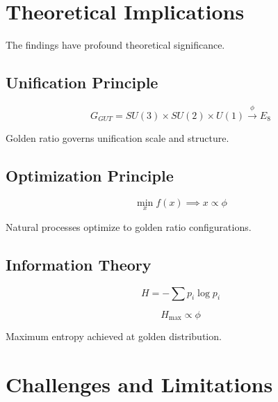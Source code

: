 \section{Theoretical Implications}

The findings have profound theoretical significance.

\subsection{Unification Principle}

\begin{theorem}
\label{thm:golden-unif}
\begin{equation}
G_{GUT} = SU(3) \times SU(2) \times U(1) \xrightarrow{\phi} E_8
\end{equation}

Golden ratio governs unification scale and structure.
\end{theorem}

\subsection{Optimization Principle}

\begin{proposition}
\label{prop:golden-opt}
\begin{equation}
\min_{x} f(x) \implies x \propto \phi
\end{equation}

Natural processes optimize to golden ratio configurations.
\end{proposition}

\subsection{Information Theory}

\begin{equation}
H = -\sum p_i \log p_i
\end{equation}

\begin{theorem}
\label{thm:golden-entropy}
\begin{equation}
H_{\max} \propto \phi
\end{equation}

Maximum entropy achieved at golden distribution.
\end{theorem}

\section{Challenges and Limitations}

